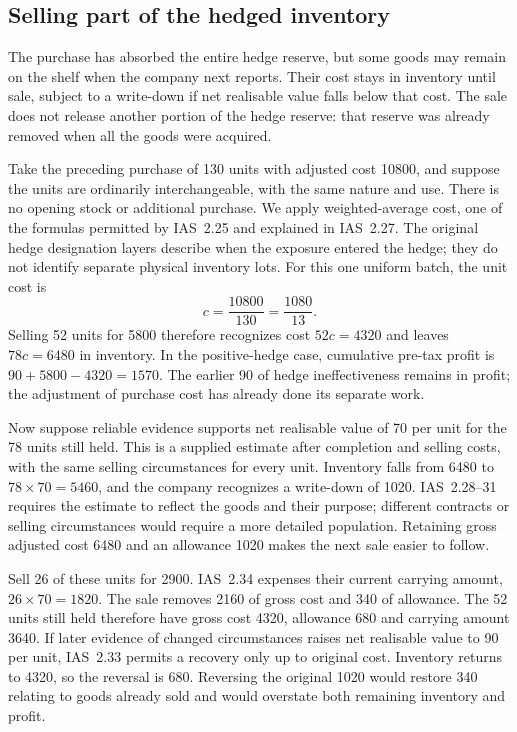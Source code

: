 \subsection{Selling part of the hedged inventory}
\label{sec:hedged-inventory-subsequent}

The purchase has absorbed the entire hedge reserve, but some goods may remain
on the shelf when the company next reports. Their cost stays in inventory until
sale, subject to a write-down if net realisable value falls below that cost.
The sale does not release another portion of the hedge reserve: that reserve
was already removed when all the goods were acquired.

Take the preceding purchase of 130 units with adjusted cost 10800, and suppose
the units are ordinarily interchangeable, with the same nature and use. There
is no opening stock or additional purchase. We apply weighted-average cost,
one of the formulas permitted by IAS~2.25 and explained in IAS~2.27. The
original hedge designation layers describe when the exposure entered the
hedge; they do not identify separate physical inventory lots. For this one
uniform batch, the unit cost is
\[
 c=\frac{10800}{130}=\frac{1080}{13}.
\]
Selling 52 units for 5800 therefore recognizes cost $52c=4320$ and leaves
$78c=6480$ in inventory. In the positive-hedge case, cumulative pre-tax profit
is $90+5800-4320=1570$. The earlier 90 of hedge ineffectiveness remains in
profit; the adjustment of purchase cost has already done its separate work.

Now suppose reliable evidence supports net realisable value of 70 per unit
for the 78 units still held. This is a supplied estimate after completion and
selling costs, with the same selling circumstances for every unit. Inventory
falls from 6480 to $78\times 70=5460$, and the company recognizes a write-down
of 1020. IAS~2.28--31 requires the estimate to reflect the goods and their
purpose; different contracts or selling circumstances would require a more
detailed population. Retaining gross adjusted cost 6480 and an allowance 1020
makes the next sale easier to follow.

Sell 26 of these units for 2900. IAS~2.34 expenses their current carrying amount,
$26\times 70=1820$. The sale removes 2160 of gross cost and 340 of allowance.
The 52 units still held therefore have gross cost 4320, allowance 680 and carrying
amount 3640. If later evidence of changed circumstances raises net realisable
value to 90 per unit, IAS~2.33 permits a recovery only up to original cost.
Inventory returns to 4320, so the reversal is 680. Reversing the original 1020
would restore 340 relating to goods already sold and would overstate both
remaining inventory and profit.

